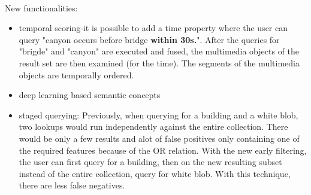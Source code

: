 \\
New functionalities:
\begin{itemize}
\item temporal scoring-it is possible to add a time property where the user can query "canyon occurs before bridge \textbf{within 30s.}". After the queries for "brigde" and "canyon" are executed and fused, the multimedia objects of the result set are then examined (for the time). The segments of the multimedia objects are temporally ordered. 

\item deep learning based semantic concepts

\item staged querying: Previously, when querying for a building and a white blob, two lookups would run independently against the entire collection. There would be only a few results and alot of false positives only containing one of the required features because of the OR relation. With the new early filtering, the user can first query for a building, then on the new resulting subset instead of the entire collection, query for white blob. With this technique, there are less false negatives.
\end{itemize}